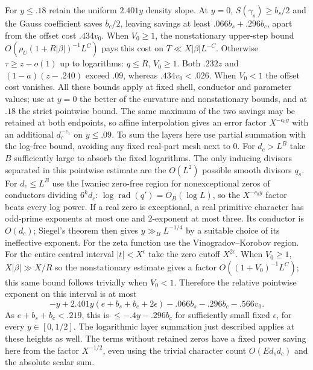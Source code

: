 \documentclass[11pt,a4paper]{article}
\theoremstyle{paperplain}
\numberwithin{equation}{section}
\begin{document}
For $y\le.18$ retain the uniform $2.401y$ density slope. At $y=0$,
$S(\gamma_s)\ge b_s/2$ and the Gauss coefficient saves $b_c/2$,
leaving savings at least $.066 b_s+.296b_c$, apart from the
offset cost $.434v_0$. When $V_0\ge1$, the nonstationary upper-step
bound $O(\rho_U(1+R|\beta|)^{-1}L^C)$ pays this cost on
$T\ll X|\beta|L^{-C}$. Otherwise $\tau\ge z-o(1)$
up to logarithms: $q\le R$, $V_0\ge1$. Both
$.232z$ and $(1-a)(z-.240)$ exceed $.09$, whereas
$.434v_0<.026$. When $V_0<1$ the offset cost vanishes.
All these bounds apply at fixed shell, conductor and parameter
values; use at $y=0$ the better of the curvature and nonstationary
bounds, and at $.18$ the strict pointwise bound. The same maximum
of the two savings may be retained at both endpoints, so affine
interpolation gives an error factor
$X^{-c_0 y}$ with an additional $d_c^{-c_1}$ on $y\le .09$.
To sum the layers here use partial summation with the log-free
bound, avoiding any fixed real-part mesh next to $0$. For
$d_c>L^B$ take $B$ sufficiently large to absorb the fixed
logarithms. The only inducing divisors separated in this pointwise
estimate are the $O(L^2)$ possible smooth divisors $q_s$.
For $d_c\le L^B$ use the Iwaniec zero-free region for nonexceptional
zeros of conductors dividing $6^k d_c$: $\log\operatorname{rad}(q')
=O_B(\log L)$, so the $X^{-c_0y}$ factor beats every log power.
If a real zero is exceptional, a real primitive character has
odd-prime exponents at most one and 2-exponent at most three.
Its conductor is $O(d_c)$; Siegel's theorem then gives
$y\gg_B L^{-1/4}$ by a suitable choice of its ineffective exponent.
For the zeta function use the Vinogradov--Korobov region.
For the entire central interval $|t|<X^\epsilon$ take the zero
cutoff $X^{2\epsilon}$. When $V_0\ge1$, $X|\beta|\gg X/R$
so the nonstationary estimate gives a factor $O((1+V_0)^{-1}L^C)$;
this same bound follows trivially when $V_0<1$. Therefore the
relative pointwise exponent on this interval is at most
\[
 -y+2.401y(e+b_s+b_c+2\epsilon)
       -.066b_s-.296b_c-.566v_0 .
\]
As $e+b_s+b_c<.219$, this is $\le-.4y-.296b_c$ for sufficiently
small fixed $\epsilon$, for every $y\in[0,1/2]$. The logarithmic
layer summation just described applies at these heights as well.
The terms without retained zeros have a fixed power saving here from
the factor $X^{-1/2}$, even using the trivial character count
$O(Ed_sd_c)$ and the absolute scalar sum.
\end{document}
